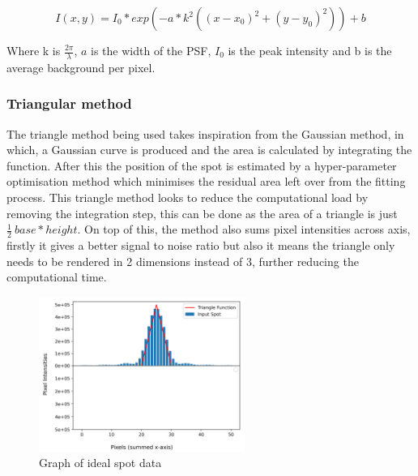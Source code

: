 \documentclass[aps,pra,a4paper,nofootinbib,onecolumn,tightenlines,longbibliography,12pt,amsfonts,amssymb,amsmath,floatfix]{revtex4-2} %
\begin{document}
    $$I(x,y)=I_0*exp(-a*k^2((x-x_0)^2+(y-y_0)^2))+b$$

    Where k is $\frac{2\pi}{\lambda}$, $a$ is the width of the PSF, $I_0$ is the peak intensity and b is the average background per pixel. \cite{small2014fluorophore}

    
    \subsubsection{Triangular method} %
    \label{ssub:Triangular method}
    
    The triangle method being used takes inspiration from the Gaussian method, in which,
    a Gaussian curve is produced and the area is calculated by integrating the function. 
    After this the position of the spot is estimated by a hyper-parameter optimisation method 
    which minimises the residual area left over from the fitting process.
    This triangle method looks to reduce the computational load by removing the integration step, 
    this can be done as the area of a triangle is just $\frac{1}{2}\ base*height$. 
    On top of this, the method also sums pixel intensities across axis, firstly it gives a 
    better signal to noise ratio but also it means the triangle only needs to be rendered in 2 dimensions 
    instead of 3, further reducing the computational time. 

    \begin{figure}[H]
      \begin{center}
        \includegraphics[width=0.6\textwidth]{project_pics/visual_test_2.png}
      \end{center}
      \caption{Graph of ideal spot data}
      \label{fig:visual_test_2}
    \end{figure}
\end{document}
